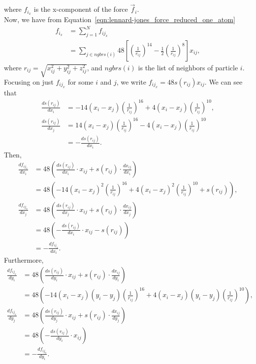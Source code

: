 \documentclass[../Main.tex]{subfiles}
\begin{document}
where $f_{i_{x}}$ is the x-component of the force $\vec{f}_{i}$. \\
Now, we have from Equation~\ref{eqn:lennard-jones_force_reduced_one_atom}
\begin{align*}
f_{i_{x}} &= \sum_{j=1}^{N} f_{ij_{x}} \\
&= \sum_{j\in ngbrs(i)} 48\left[ \left( \frac{1}{r_{ij}}\right)^{14} - \frac{1}{2}\left( \frac{1}{r_{ij}}\right)^{8} \right]x_{ij},
\end{align*} where $r_{ij} = \sqrt{x_{ij}^{2} + y_{ij}^{2} + z_{ij}^{2}}$, and $ngbrs(i)$ is the list of neighbors of particle $i$. \\
Focusing on just $f_{ij_{x}}$ for some $i$ and $j$, we write $f_{ij_{x}} = 48s(r_{ij})x_{ij}$. We can see that
\begin{align*}
\frac{ds(r_{ij})}{dx_{i}} & = -14\left(x_{i} - x_{j}\right)\left(\frac{1}{r_{ij}}\right)^{16}+ 4\left(x_{i} - x_{j}\right)\left(\frac{1}{r_{ij}}\right)^{10}, \\
\frac{ds(r_{ij})}{dx_{j}} & = 14\left(x_{i} - x_{j}\right)\left(\frac{1}{r_{ij}}\right)^{16} - 4\left(x_{i} - x_{j}\right)\left(\frac{1}{r_{ij}}\right)^{10} \\
& = - \frac{ds(r_{ij})}{dx_{i}}.
\end{align*}
Then,
\begin{align}
\frac{df_{ij_{x}}}{dx_{i}} &= 48\left(\frac{ds(r_{ij})}{dx_{i}}\cdot x_{ij} + s(r_{ij})\cdot \frac{dx_{ij}}{dx_{i}}\right) \nonumber \\
&= 48\left(-14\left(x_{i} - x_{j}\right)^{2}\left(\frac{1}{r_{ij}}\right)^{16}+ 4\left(x_{i} - x_{j}\right)^{2}\left(\frac{1}{r_{ij}}\right)^{10} +  s(r_{ij})\right), \label{eqn:i_point_derivate_x_i} \\
\frac{df_{ij_{x}}}{dx_{j}} &= 48\left(\frac{ds(r_{ij})}{dx_{j}}\cdot x_{ij} + s(r_{ij})\cdot \frac{dx_{ij}}{dx_{j}}\right) \nonumber \\
&= 48\left(- \frac{ds(r_{ij})}{dx_{i}}\cdot x_{ij} - s(r_{ij})\right) \nonumber \\
&= -\frac{df_{ij_{x}}}{dx_{i}}. \label{eqn:negative_j_point_derivative_x}
\end{align}
Furthermore,
\begin{align}
\frac{df_{ij_{x}}}{dy_{i}} &= 48\left(\frac{ds(r_{ij})}{dy_{i}}\cdot x_{ij} + s(r_{ij})\cdot \frac{dx_{ij}}{dy_{i}}\right) \nonumber \\
&= 48\left(-14\left(x_{i} - x_{j}\right)\left(y_{i} - y_{j}\right)\left(\frac{1}{r_{ij}}\right)^{16}+ 4\left(x_{i} - x_{j}\right)\left(y_{i} - y_{j}\right)\left(\frac{1}{r_{ij}}\right)^{10}\right), \label{eqn:i_point_derivate_y_i} \\
\frac{df_{ij_{x}}}{dy_{j}} &= 48\left(\frac{ds(r_{ij})}{dy_{j}}\cdot x_{ij} + s(r_{ij})\cdot \frac{dx_{ij}}{dy_{j}}\right) \nonumber \\
&= 48\left(-\frac{ds(r_{ij})}{dy_{i}}\cdot x_{ij}\right) \nonumber\\
& = -\frac{df_{ij_{x}}}{dy_{i}}. \label{eqn:negative_j_point_derivative_y}
\end{align}
\end{document}
